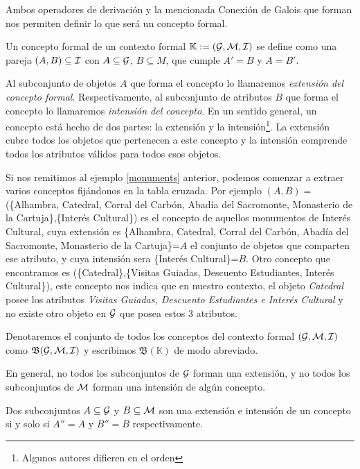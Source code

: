 \documentclass[oneside,openright,titlepage,numbers=noenddot,openany,headinclude,footinclude=true,
cleardoublepage=empty,abstractoff,BCOR=5mm,paper=a4,fontsize=12pt,main=spanish]{scrreprt}
\begin{document}
Ambos operadores de derivación y la mencionada Conexión de Galois que forman nos permiten definir lo que será un concepto formal. 


\begin{definition}\label{defconcept} Un concepto formal de un contexto formal $\mathbb{K}:=(\mathcal{G},\mathcal{M},\mathcal{I})$ se define como una pareja $(A,B) \subseteq \mathcal{I}$ con $A\subseteq \mathcal{G}$, $B\subseteq M$, que cumple $A'=B$ y $A=B'$.
\end{definition}

Al subconjunto de objetos $A$ que forma el concepto lo llamaremos \textit{extensión del concepto formal}. Respectivamente, al subconjunto de atributos $B$ que forma el concepto lo llamaremos \textit{intensión del concepto}. En un sentido general, un concepto está hecho de dos partes: la extensión y la intensión\footnote{Algunos autores difieren en el orden}. La extensión cubre todos los objetos que pertenecen a este concepto y la intensión comprende todos los atributos válidos para todos esos objetos.

Si nos remitimos al ejemplo \ref{monuments} anterior, podemos comenzar a extraer varios conceptos fijándonos en la tabla cruzada. Por ejemplo $(A,B)=$(\{Alhambra, Catedral, Corral del Carbón, Abadía del Sacromonte, Monasterio de la Cartuja\},\{Interés Cultural\}) es el concepto de aquellos monumentos de Interés Cultural, cuya extensión es \{Alhambra, Catedral, Corral del Carbón, Abadía del Sacromonte, Monasterio de la Cartuja\}=$A$ el conjunto de objetos que comparten ese atributo, y cuya intensión sera \{Interés Cultural\}=$B$. Otro concepto que encontramos es (\{Catedral\},\{Visitas Guiadas, Descuento Estudiantes, Interés Cultural\}), este concepto nos indica que en nuestro contexto, el objeto \textit{Catedral} posee los atributos \textit{Visitas Guiadas, Descuento Estudiantes e Interés Cultural} y no existe otro objeto en $\mathcal{G}$ que posea estos 3 atributos.

Denotaremos el conjunto de todos los conceptos del contexto formal $(\mathcal{G},\mathcal{M},\mathcal{I})$ como $\mathfrak{B} (\mathcal{G},\mathcal{M},\mathcal{I})$ y escribimos $\mathfrak{B}(\mathbb{K})$ de modo abreviado.

En general, no todos los subconjuntos de $\mathcal{G}$ forman una extensión, y no todos los subconjuntos de $\mathcal{M}$ forman una intensión de algún concepto. 

\begin{proposition}\cite{conceptualexploration}

Dos subconjuntos $A \subseteq \mathcal{G} $ y $B \subseteq \mathcal{M}$ son una extensión e intensión de un concepto si y solo si $A''= A$ y $ B''=B$ respectivamente.

\end{proposition}
\end{document}
